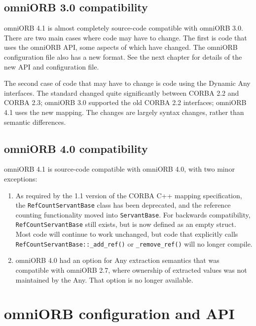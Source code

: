 \documentclass[11pt,twoside,a4paper]{book}
\newcommand{\type}[1]{\texttt{#1}}
\newcommand{\op}[1]{\texttt{#1()}}
\begin{document}
\section{omniORB 3.0 compatibility}

omniORB 4.1 is almost completely source-code compatible with omniORB
3.0. There are two main cases where code may have to change. The first
is code that uses the omniORB API, some aspects of which have
changed. The omniORB configuration file also has a new format. See the
next chapter for details of the new API and configuration file.

The second case of code that may have to change is code using the
Dynamic Any interfaces. The standard changed quite significantly
between CORBA 2.2 and CORBA 2.3; omniORB 3.0 supported the old CORBA
2.2 interfaces; omniORB 4.1 uses the new mapping. The changes are
largely syntax changes, rather than semantic differences.


\section{omniORB 4.0 compatibility}

omniORB 4.1 is source-code compatible with omniORB 4.0, with two minor
exceptions:

\begin{enumerate}

\item As required by the 1.1 version of the CORBA C++ mapping
  specification, the \type{RefCountServantBase} class has been
  deprecated, and the reference counting functionality moved into
  \type{ServantBase}. For backwards compatibility,
  \type{RefCountServantBase} still exists, but is now defined as an
  empty struct. Most code will continue to work unchanged, but code
  that explicitly calls \op{RefCountServantBase::\_add\_ref} or
  \op{\_remove\_ref} will no longer compile.

\item omniORB 4.0 had an option for Any extraction semantics that was
  compatible with omniORB 2.7, where ownership of extracted values was
  not maintained by the Any. That option is no longer available.

\end{enumerate}



\chapter{omniORB configuration and API}
\label{chap:config}
\end{document}
